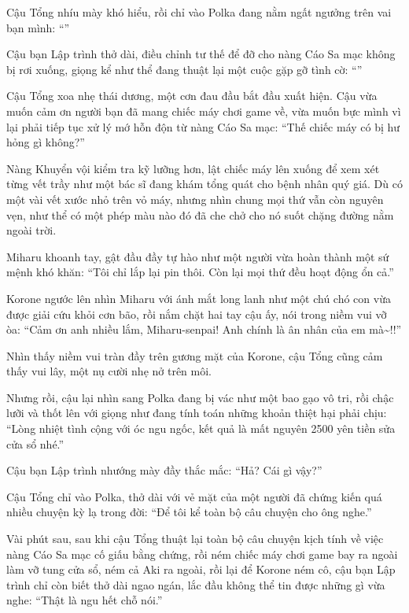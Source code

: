 \documentclass[../main.tex]{subfiles}
\begin{document}
Cậu Tổng nhíu mày khó hiểu, rồi chỉ vào Polka đang nằm ngất ngưởng trên vai bạn mình: ``''

Cậu bạn Lập trình thở dài, điều chỉnh tư thế để đỡ cho nàng Cáo Sa mạc không bị rơi xuống, giọng kể như thể đang thuật lại một cuộc gặp gỡ tình cờ: ``''

Cậu Tổng xoa nhẹ thái dương, một cơn đau đầu bắt đầu xuất hiện. Cậu vừa muốn cảm ơn người bạn đã mang chiếc máy chơi game về, vừa muốn bực mình vì lại phải tiếp tục xử lý mớ hỗn độn từ nàng Cáo Sa mạc: ``Thế chiếc máy có bị hư hỏng gì không?''

Nàng Khuyển vội kiểm tra kỹ lưỡng hơn, lật chiếc máy lên xuống để xem xét từng vết trầy như một bác sĩ đang khám tổng quát cho bệnh nhân quý giá. Dù có một vài vết xước nhỏ trên vỏ máy, nhưng nhìn chung mọi thứ vẫn còn nguyên vẹn, như thể có một phép màu nào đó đã che chở cho nó suốt chặng đường nằm ngoài trời.

Miharu khoanh tay, gật đầu đầy tự hào như một người vừa hoàn thành một sứ mệnh khó khăn: ``Tôi chỉ lắp lại pin thôi. Còn lại mọi thứ đều hoạt động ổn cả.''

Korone ngước lên nhìn Miharu với ánh mắt long lanh như một chú chó con vừa được giải cứu khỏi cơn bão, rồi nắm chặt hai tay cậu ấy, nói trong niềm vui vỡ òa: ``Cảm ơn anh nhiều lắm, Miharu-senpai! Anh chính là ân nhân của em mà\~{}!!''

Nhìn thấy niềm vui tràn đầy trên gương mặt của Korone, cậu Tổng cũng cảm thấy vui lây, một nụ cười nhẹ nở trên môi.

Nhưng rồi, cậu lại nhìn sang Polka đang bị vác như một bao gạo vô tri, rồi chậc lưỡi và thốt lên với giọng như đang tính toán những khoản thiệt hại phải chịu: ``Lòng nhiệt tình cộng với óc ngu ngốc, kết quả là mất nguyên 2500 yên tiền sửa cửa sổ nhé.''

Cậu bạn Lập trình nhướng mày đầy thắc mắc: ``Hả? Cái gì vậy?''

Cậu Tổng chỉ vào Polka, thở dài với vẻ mặt của một người đã chứng kiến quá nhiều chuyện kỳ lạ trong đời: ``Để tôi kể toàn bộ câu chuyện cho ông nghe.''

Vài phút sau, sau khi cậu Tổng thuật lại toàn bộ câu chuyện kịch tính về việc nàng Cáo Sa mạc cố giấu bằng chứng, rồi ném chiếc máy chơi game bay ra ngoài làm vỡ tung cửa sổ, ném cả Aki ra ngoài, rồi lại để Korone ném cô, cậu bạn Lập trình chỉ còn biết thở dài ngao ngán, lắc đầu không thể tin được những gì vừa nghe: ``Thật là ngu hết chỗ nói.''
\end{document}
